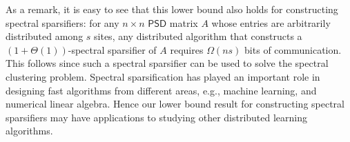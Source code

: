 As a  remark, it is easy to see that this  lower bound also holds for constructing spectral sparsifiers: for any $n\times n$ $\mathsf{PSD}$ matrix $A$ whose entries are arbitrarily distributed among $s$ sites, any distributed algorithm that constructs a $(1+\Theta(1))$-spectral sparsifier of $A$ requires $\Omega(ns)$ bits of communication. This follows since such a spectral sparsifier can be used to solve the spectral clustering problem. Spectral sparsification has played an important role in designing fast algorithms from different areas, e.g., machine learning, and  numerical linear algebra. Hence our lower bound result for constructing spectral sparsifiers may have applications to studying other distributed learning algorithms.


 

